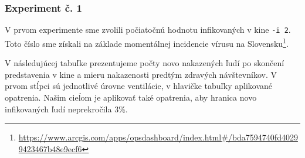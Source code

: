 \documentclass[a4paper, 11pt]{article}
\begin{document}
        \subsubsection{Experiment č. 1}
        \label{sec:ex.1}
        V prvom experimente sme zvolili počiatočnú hodnotu infikovaných v kine \texttt{-i 2}. Toto číslo sme získali na základe momentálnej incidencie vírusu na Slovensku\footnote{\href{https://www.arcgis.com/apps/opsdashboard/index.html\#/bda7594740fd40299423467b48e9ecf6}{https://www.arcgis.com/apps/opsdashboard/index.html\#/bda7594740fd40299423467b48e9ecf6}}.
        
        \par V následujúcej tabuľke prezentujeme počty novo nakazených ľudí po skončení predstavenia v kine a mieru nakazenosti predtým zdravých návštevníkov. V prvom stĺpci sú jednotlivé úrovne ventilácie, v hlavičke tabuľky aplikované opatrenia. Našim cieĺom je aplikovať také opatrenia, aby hranica novo infikovaných ľudí neprekročila 3\%.
        
        \begin{table}[]
        \end{table}
        
\end{document}
